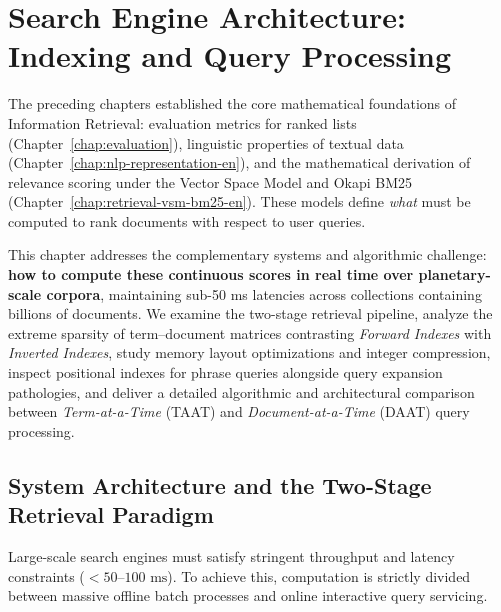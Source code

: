 \chapter{Search Engine Architecture: Indexing and Query Processing}
\label{chap:indexing-query-processing-en}

The preceding chapters established the core mathematical foundations of Information Retrieval: evaluation metrics for ranked lists (Chapter~\ref{chap:evaluation}), linguistic properties of textual data (Chapter~\ref{chap:nlp-representation-en}), and the mathematical derivation of relevance scoring under the Vector Space Model and Okapi BM25 (Chapter~\ref{chap:retrieval-vsm-bm25-en}). These models define \textit{what} must be computed to rank documents with respect to user queries.

This chapter addresses the complementary systems and algorithmic challenge: \textbf{how to compute these continuous scores in real time over planetary-scale corpora}, maintaining sub-50 ms latencies across collections containing billions of documents. We examine the two-stage retrieval pipeline, analyze the extreme sparsity of term--document matrices contrasting \textit{Forward Indexes} with \textit{Inverted Indexes}, study memory layout optimizations and integer compression, inspect positional indexes for phrase queries alongside query expansion pathologies, and deliver a detailed algorithmic and architectural comparison between \textit{Term-at-a-Time} (TAAT) and \textit{Document-at-a-Time} (DAAT) query processing.

\FloatBarrier
\section{System Architecture and the Two-Stage Retrieval Paradigm}
\label{sec:two-stage-architecture-en}

Large-scale search engines must satisfy stringent throughput and latency constraints ($< 50\text{--}100\text{ ms}$). To achieve this, computation is strictly divided between massive offline batch processes and online interactive query servicing.


